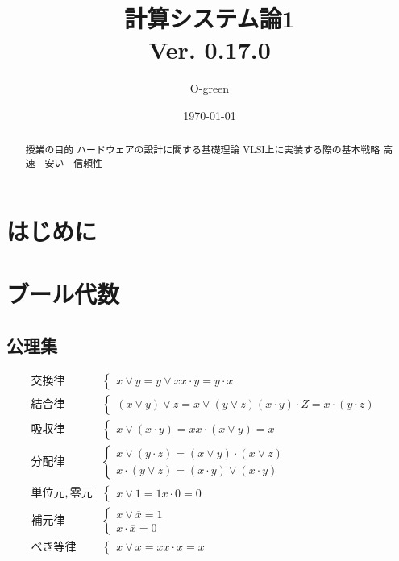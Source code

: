 \documentclass[a4j,10pt,oneside,openany,fleqn]{jsbook}
\title{{\Huge \textbf{計算システム論1}}\\ {\small Ver. 0.17.0}}
\author{O-green}
\date{\today}
\begin{document}
%
%
\maketitle
\frontmatter
\tableofcontents
%
%
\mainmatter

\chapter{はじめに}
\begin{abstract}
  授業の目的
  ハードウェアの設計に関する基礎理論
  VLSI上に実装する際の基本戦略
  高速　安い　信頼性
\end{abstract}

\chapter{ブール代数}

\setcounter{section}{-1}
\section{公理集}
\begin{align}
  交換律&
  \begin{cases}
    x \vee y = y \vee x
    x \cdot y = y \cdot x
  \end{cases} &\\
  結合律&
  \begin{cases}
    (x \vee y) \vee z = x \vee (y \vee z)
    (x \cdot y) \cdot Z = x \cdot (y \cdot z)
  \end{cases}&\\
  吸収律&
  \begin{cases}
    x \vee (x \cdot y) = x
    x \cdot (x \vee y) = x
  \end{cases}&\\
  分配律&
  \begin{cases}
    x \vee (y \cdot z) = (x \vee y) \cdot (x \vee z)\\
    x \cdot (y \vee z) = (x \cdot y) \vee (x \cdot y)
  \end{cases}& \\
  単位元, 零元&
  \begin{cases}
    x \vee 1 = 1
    x \cdot 0 = 0
  \end{cases}&\\
  補元律&
  \begin{cases}
    x \vee \overline{x} = 1\\
    x \cdot \overline{x} = 0
  \end{cases}& \\
  べき等律&
  \begin{cases}
    x \vee x = x
    x \cdot x = x  
  \end{cases}&  
\end{align}
\end{document}
